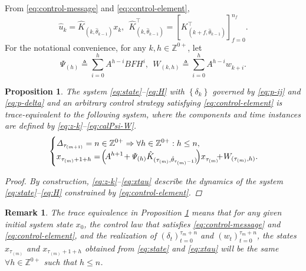 \documentclass[journal,twoside,web]{ieeecolor}
\newtheorem{remark}{Remark}
\newtheorem{proposition}{Proposition}
\begin{document}
From \eqref{eq:control-message} and \eqref{eq:control-element}, 
\begin{equation}\label{eq:control-gains-matrix}
    \hat{u}_{k} = \hat{K}_{(k,\hat{\theta}_{k-1})} x_k,~~
    \hat{K}_{(k,\hat{\theta}_{k-1})}^{\top} = \left[K_{(k+f,\hat{\theta}_{k-1})}^{\top}\right]_{f=0}^{n_f}.
\end{equation}
For the notational convenience, for any $k,h\in\mathbb{Z}^{0+}$, let
\begin{equation}\label{eq:calPsi-W}
\mathit{\Psi}_{(h)} \triangleq \sum_{i=0}^{h}A^{h-i}BFH^{i},~~
W_{\!(k,h)} \!\triangleq\! \sum_{i=0}^{h}A^{h-i} w_{k+i}^{}.
\end{equation}

\begin{proposition}\label{prop:equiv}
    The system \eqref{eq:state}--\eqref{eq:H} 
    with $\left\{\delta_{k}\right\}$ governed by \eqref{eq:p-ij} and \eqref{eq:p-delta} and an arbitrary control strategy satisfying %
    \eqref{eq:control-element} is trace-equivalent to the following system, where the components and time instances are defined by \eqref{eq:z-k}--\eqref{eq:calPsi-W}.
    \begin{equation}\label{eq:xtau}
    \text{\small $
    \begin{cases}
        \mathit{\Delta}_{\tau_{(m+1)}} = n \in \mathbb{Z}^{0+}  \Rightarrow  \forall h \in \mathbb{Z}^{0+} : h \leq n, \\
         x_{\tau_{(m)}+1+h}^{} =\! \Big(\!A^{h+1} \!+\! \mathit{\Psi}_{(h)}\hat{K}_{(\tau_{(m)},\hat{\theta}_{\tau_{(m)}-1})}\!\Big)x_{\tau_{(m)}}^{} \!\!\!+\! W_{(\tau_{(m)},h)}.\!\!\!\!\!\!\!
    \end{cases}$}
    \end{equation}
    \begin{proof}
        By construction, \eqref{eq:z-k}--\eqref{eq:xtau} describe the dynamics of the system \eqref{eq:state}--\eqref{eq:H} constrained by %
        \eqref{eq:control-element}.
    \end{proof}
\end{proposition}
\begin{remark}\label{rem:trace-equivalence}
The trace equivalence in Proposition \ref{prop:equiv} means that for any given initial system state $x_{0}$, the control law that satisfies \eqref{eq:control-message} and \eqref{eq:control-element}, and the realization of $\left(\delta_{t}\right)_{t=0}^{\tau_{m}+n}$ and $\left(w_{t}\right)_{t=0}^{\tau_{m}+n}$, the states $x_{\tau_{(m)}}$ and $x_{\tau_{(m)}+1+h}$ obtained from \eqref{eq:state} and \eqref{eq:xtau} will be the same $\forall h\in \mathbb{Z}^{0+}$ such that $h\leq n$. 
\end{remark}
\end{document}
